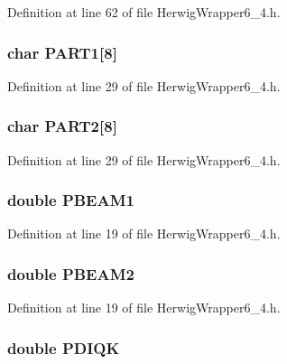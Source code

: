 Definition at line 62 of file Herwig\-Wrapper6\_\-4.h.
\subsubsection{\setlength{\rightskip}{0pt plus 5cm}char {\bf PART1}[8]}\label{HerwigWrapper6__4_8h_7f9061b885fcff8b79bb4d15a28c954c}




Definition at line 29 of file Herwig\-Wrapper6\_\-4.h.
\subsubsection{\setlength{\rightskip}{0pt plus 5cm}char {\bf PART2}[8]}\label{HerwigWrapper6__4_8h_b7c93cf8528661ea0b8f797a316e2b64}




Definition at line 29 of file Herwig\-Wrapper6\_\-4.h.
\subsubsection{\setlength{\rightskip}{0pt plus 5cm}double {\bf PBEAM1}}\label{HerwigWrapper6__4_8h_39fd282718a0322a0bd2d6cfc270fa55}




Definition at line 19 of file Herwig\-Wrapper6\_\-4.h.
\subsubsection{\setlength{\rightskip}{0pt plus 5cm}double {\bf PBEAM2}}\label{HerwigWrapper6__4_8h_93e2008baa0205d3e429baa4fec05494}




Definition at line 19 of file Herwig\-Wrapper6\_\-4.h.
\subsubsection{\setlength{\rightskip}{0pt plus 5cm}double {\bf PDIQK}}\label{HerwigWrapper6__4_8h_ae64789c4d46cd9305e7cd38703d23be}




